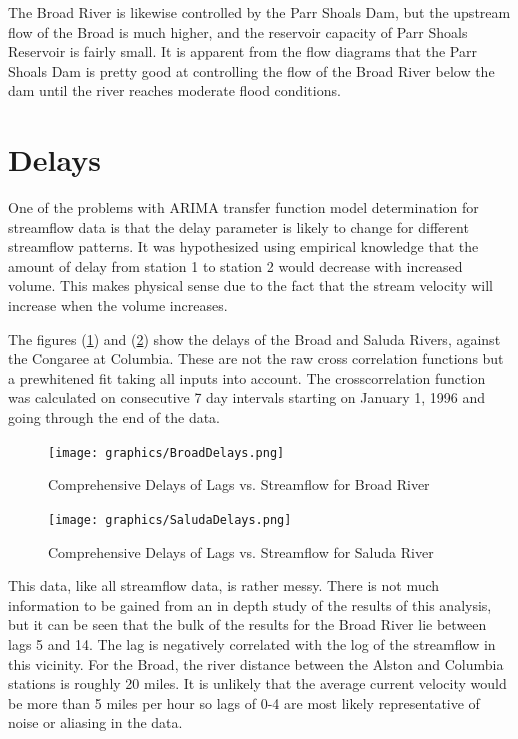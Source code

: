 \documentclass[12pt]{report}
\begin{document}
The Broad River is likewise controlled by the Parr Shoals Dam, but
the upstream flow of the Broad is much higher, and the reservoir
capacity of Parr Shoals Reservoir is fairly small.  It is apparent
from the flow diagrams that the Parr Shoals Dam is pretty good at
controlling the flow of the Broad River below the dam until the
river reaches moderate flood conditions.

\section{Delays}
One of the problems with ARIMA transfer function model
determination for streamflow data is that the delay parameter is
likely to change for different streamflow patterns.  It was
hypothesized using empirical knowledge that the amount of delay
from station 1 to station 2 would decrease with increased volume.
This makes physical sense due to the fact that the stream velocity
will increase when the volume increases.



The figures (\ref{fig:brddel}) and (\ref{fig:saldel}) show the
delays of the Broad and Saluda Rivers, against the Congaree at
Columbia. These are not the raw cross correlation functions but a
prewhitened fit taking all inputs into account.  The
crosscorrelation function was calculated on consecutive 7 day
intervals starting on January 1, 1996 and going through the end of
the data.
\begin{figure}[h]
\centering\texttt{[image: graphics/BroadDelays.png]}
\caption{Comprehensive Delays of Lags vs. Streamflow for Broad
River}\label{fig:brddel}
\end{figure}


\begin{figure}[h]
\centering\texttt{[image: graphics/SaludaDelays.png]}
\caption{Comprehensive Delays of Lags vs. Streamflow for Saluda
River}\label{fig:saldel}
\end{figure}
This data, like all streamflow data, is rather messy. There is not
much information to be gained from an in depth study of the
results of this analysis, but it can be seen that the bulk of the
results for the Broad River lie between lags 5 and 14. The lag is
negatively correlated with the log of the streamflow in this
vicinity.  For the Broad, the river distance between the Alston
and Columbia stations is roughly 20 miles.  It is unlikely that
the average current velocity would be more than 5 miles per hour
so lags of 0-4 are most likely representative of noise or aliasing
in the data.
\end{document}
